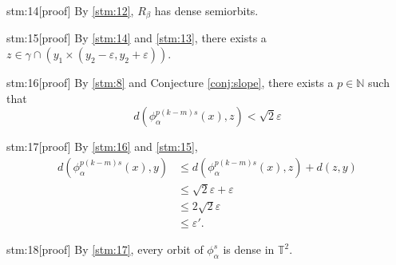\documentclass{article}
\begin{document}
\begin{stm}{stm:14}[proof]
By \ref{stm:12}, $R_\beta$ has dense semiorbits.
\end{stm}

\begin{stm}{stm:15}[proof]
By \ref{stm:14} and \ref{stm:13}, there exists a $z \in \gamma \cap (y_1 \times (y_2 - \varepsilon, y_2 + \varepsilon))$.
\end{stm}

\begin{stm}{stm:16}[proof]
By \ref{stm:8} and Conjecture \ref{conj:slope}, there exists a $p \in \mathbb{N}$ such that $$d(\phi_\alpha^{p(k-m)s}(x), z) < \sqrt{2} \varepsilon$$
\end{stm}

\begin{stm}{stm:17}[proof]
By \ref{stm:16} and \ref{stm:15},
\begin{align*}
d(\phi_\alpha^{p(k-m)s}(x), y)
&\le d(\phi_\alpha^{p(k-m)s}(x), z) + d(z, y) \\
&\le \sqrt{2} \varepsilon + \varepsilon \\
&\le 2\sqrt{2} \varepsilon \\
&\le \varepsilon'.
\end{align*}
\end{stm}


\begin{stm}{stm:18}[proof]
By \ref{stm:17}, every orbit of $\phi_\alpha^s$ is dense in $\mathbb{T}^2$.
\end{stm}
\end{document}
